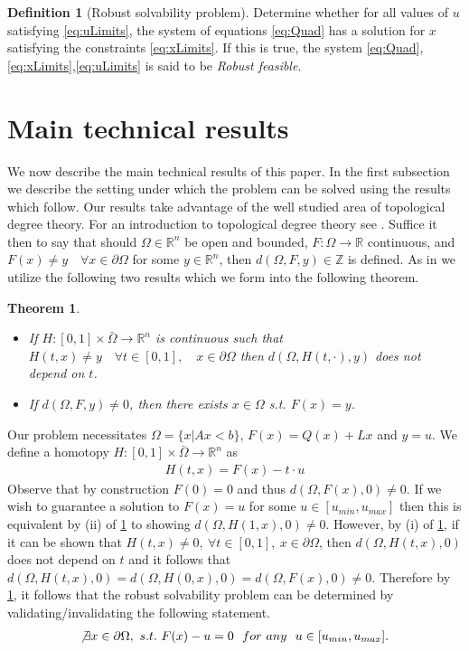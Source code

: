 \documentclass[11pt]{article}
\theoremstyle{plain}
\newtheorem{thm}{Theorem}[section]
\theoremstyle{definition}
\newtheorem{cdef}{Definition}[section]
\theoremstyle{remark}
\begin{document}
\begin{cdef}[Robust solvability problem]
Determine whether for all values of $u$ satisfying \eqref{eq:uLimits}, the system of equations \eqref{eq:Quad} has a solution for $x$ satisfying the constraints \eqref{eq:xLimits}. If this is true, the system \eqref{eq:Quad},\eqref{eq:xLimits},\eqref{eq:uLimits} is said to be \emph{Robust feasible}.
\end{cdef}

\section{Main technical results}
We now describe the main technical results of this paper. In the first subsection we describe the setting under which the problem can be solved using the results which follow. Our results take advantage of the well studied area of topological degree theory. For an introduction to topological degree theory see {\color{blue}{NEED REFS}}. Suffice it then to say that should $\Omega\in\mathbb{R}^{n}$ be open and bounded, $F:\Omega\rightarrow \mathbb{R}$ continuous, and $F(x)\neq y \quad \forall x\in\partial\Omega$ for some $y\in\mathbb{R}^n$, then $d\left(\Omega,F,y\right)\in\mathbb{Z}$ is defined. 
As in {\color{blue}{Frommer, Hoxha and Lang Thm1}} we utilize the following two results which we form into the following theorem.
\begin{thm} \ \\
\label{thm:Deg}
\begin{itemize}
\item[(i)] If $H : [0,1]\times\bar{\Omega}\rightarrow\mathbb{R}^n$ is continuous such that $H(t,x)\neq y \quad \forall t\in[0,1], \quad x\in\partial\Omega$ then $d\left(\Omega,H(t,\cdot),y\right)$ does not depend on $t$.
\item[(ii)] If $d(\Omega,F,y)\neq 0$, then there exists $x\in\Omega$ s.t. $F(x)=y$.
\end{itemize}

\end{thm}

Our problem necessitates $\Omega=\{x| Ax< b\}$, $F(x)=Q(x)+Lx$ and $y=u$. We define a homotopy $H : [0,1]\times\bar{\Omega}\rightarrow\mathbb{R}^n$ as 
\begin{align}
H(t,x) = F(x)-t\cdot u \label{eq:Homo}
\end{align}
Observe that by construction $F(0)=0$ and thus $d(\Omega,F(x),0)\neq 0$. If we wish to guarantee a solution to $F(x)=u$ for some $u\in[u_{min},u_{max}]$ then this is equivalent by (ii) of \cref{thm:Deg} to showing $d(\Omega,H(1,x),0)\neq 0$. However, by (i) of \cref{thm:Deg}, if it can be shown that $H(t,x)\neq 0, \  \forall t\in[0,1], \  x\in\partial\Omega$, then $d\left(\Omega,H(t,x),0\right)$ does not depend on $t$ and it follows that $d\left(\Omega,H(t,x),0\right)=d\left(\Omega,H(0,x),0\right)=d(\Omega,F(x),0)\neq 0$. Therefore by \cref{thm:Deg}, it follows that the robust solvability problem can be determined by validating/invalidating the following statement.
\begin{align}
\not\exists x\in\partial\Omega, \ s.t. \ F(x)-u=0 \ \ for \ any \ \ u\in[u_{min},u_{max}]. \label{eq:RSForm}
\end{align}
\end{document}
